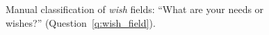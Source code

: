 \begin{figure}[h!]
    \caption[Manual classification of \textit{wish} fields]{Manual classification of \textit{wish} fields: ``What are your needs or wishes?'' (Question~\ref{q:wish_field}).
    }\label{fig:wish_field}
\end{figure}

